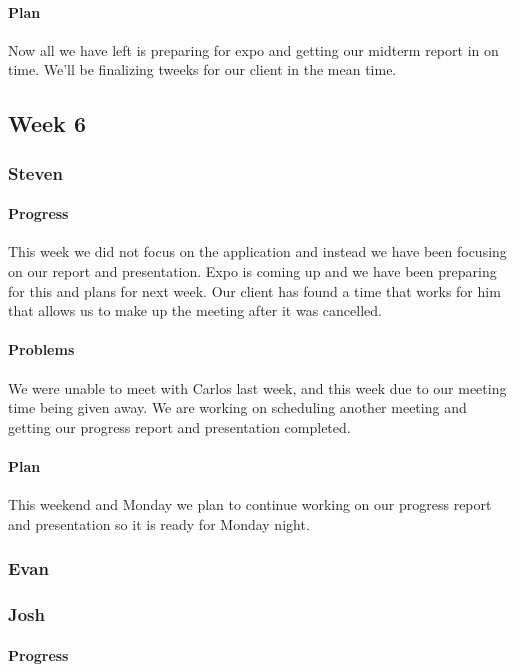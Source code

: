 \documentclass[onecolumn, draftclsnofoot,10pt, compsoc]{IEEEtran}
\begin{document}
	\paragraph{Plan}
	Now all we have left is preparing for expo and getting our midterm report in on time. We'll be finalizing tweeks for our client in the mean time.
\subsection{Week 6}
	\subsubsection{Steven}
	
	\paragraph{Progress}
	This week we did not focus on the application and instead we have been focusing on our report and presentation. Expo is coming up and we have been preparing for this and plans for next week. Our client has found a time that works for him that allows us to make up the meeting after it was cancelled. 
	
	\paragraph{Problems}
	We were unable to meet with Carlos last week, and this week due to our meeting time being given away. We are working on scheduling another meeting and getting our progress report and presentation completed.
	
	\paragraph{Plan}
	This weekend and Monday we plan to continue working on our progress report and presentation so it is ready for Monday night.
	
	\subsubsection{Evan}
	
	\subsubsection{Josh}
	
	\paragraph{Progress}
	
\end{document}
